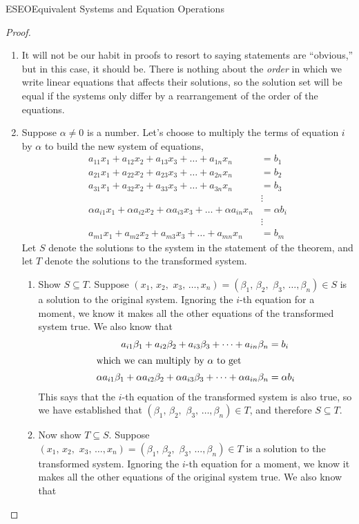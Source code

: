 \begin{subsect}{ESEO}{Equivalent Systems and Equation Operations}
\begin{proof}
\begin{para}
%
\begin{enumerate}
\item  It will not be our habit in proofs to resort to saying statements are ``obvious,'' but in this case, it should be.  There is nothing about the {\em order} in which we write linear equations that affects their solutions, so the solution set will be equal if the systems only differ by a rearrangement of the order of the equations.
\item  Suppose $\alpha\neq 0$ is a number.  Let's choose to multiply the terms of equation $i$ by $\alpha$ to build the new system of equations,
%
\begin{align*}
a_{11}x_1+a_{12}x_2+a_{13}x_3+\dots+a_{1n}x_n&=b_1\\
a_{21}x_1+a_{22}x_2+a_{23}x_3+\dots+a_{2n}x_n&=b_2\\
a_{31}x_1+a_{32}x_2+a_{33}x_3+\dots+a_{3n}x_n&=b_3\\
&\vdots\\
\alpha a_{i1}x_1+\alpha a_{i2}x_2+\alpha a_{i3}x_3+\dots+\alpha a_{in}x_n&=\alpha b_i\\
&\vdots\\
a_{m1}x_1+a_{m2}x_2+a_{m3}x_3+\dots+a_{mn}x_n&=b_m
\end{align*}
%
Let $S$ denote the solutions to the system in the statement of the theorem, and let $T$ denote the solutions to the transformed system.
\begin{enumerate}
%
\item Show $S\subseteq T$.  Suppose $(x_1,\,x_2,\,\,x_3,\,\ldots,x_n)=(\beta_1,\,\beta_2,\,\,\beta_3,\,\ldots,\beta_n)\in S$ is a solution to the original system.  Ignoring the $i$-th equation for a moment, we know it makes all the other equations of the transformed system true.  We also know that
%
\begin{align*}
a_{i1}\beta_1+a_{i2}\beta_2+a_{i3}\beta_3+\dots+a_{in}\beta_n&=b_i\\
\intertext{which we can multiply by $\alpha$ to get}
\alpha a_{i1}\beta_1+\alpha a_{i2}\beta_2+\alpha a_{i3}\beta_3+\dots+\alpha a_{in}\beta_n&=\alpha b_i
\end{align*}
%
This says that the $i$-th equation of the transformed system is also true, so we have established that $(\beta_1,\,\beta_2,\,\,\beta_3,\,\ldots,\beta_n)\in T$, and therefore $S\subseteq T$.
%
\item Now show $T\subseteq S$.  Suppose $(x_1,\,x_2,\,\,x_3,\,\ldots,x_n)=(\beta_1,\,\beta_2,\,\,\beta_3,\,\ldots,\beta_n)\in T$ is a solution to the transformed system.  Ignoring the $i$-th equation for a moment, we know it makes all the other equations of the original system true.  We also know that

\end{enumerate}
\end{enumerate}
\end{para}
\end{proof}
\end{subsect}
